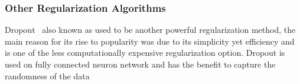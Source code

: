\subsubsection{Other Regularization Algorithms}

Dropout~\cite{JMLR:v15:srivastava14a} also known as used to be another powerful regularization method, the main reason for its rise to popularity was due to its simplicity yet efficiency and is one of the less computationally expensive regularization option. Dropout is used on fully connected neuron network and has the benefit to capture the randomness of the data